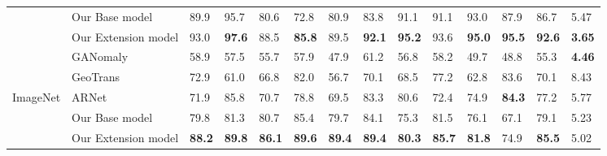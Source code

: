 \documentclass[journal]{IEEEtran}
\theoremstyle{remark}
\begin{document}
\begin{table*}[!htb]
\begin{minipage}[t]{0.95\textwidth}
\begin{tabular}{cx{3.0cm}x{0.6cm}x{0.6cm}x{0.6cm}x{0.6cm}x{0.6cm}x{0.6cm}x{0.6cm}x{0.6cm}x{0.6cm}x{0.6cm}x{0.6cm}x{0.8cm}}
    & Our Base model & 89.9 & 95.7 & 80.6 & 72.8 & 80.9 & 83.8 & 91.1 & 91.1 & 93.0 & 87.9 & 86.7 & 5.47\\
	& Our Extension model & 93.0 & \textbf{97.6} & 88.5 & \textbf{85.8} & 89.5 & \textbf{92.1} & \textbf{95.2} & 93.6 & \textbf{95.0} & \textbf{95.5} & \textbf{92.6} & \textbf{3.65}\\
	\cmidrule(lr){1-14}
	    & GANomaly~\cite{Akcay2018} 
		& 58.9 & 57.5 & 55.7 & 57.9 & 47.9 & 61.2 & 56.8 & 58.2 & 49.7 & 48.8 & 55.3 & \textbf{4.46}\\
		& GeoTrans~\cite{golan2018deep} 
		& 72.9 & 61.0 & 66.8 & 82.0 & 56.7 & 70.1 & 68.5 & 77.2 & 62.8 & 83.6 & 70.1 & 8.43\\
		ImageNet & ARNet~\cite{fye2020ARNet} & 71.9 & 85.8 & 70.7 & 78.8 & 69.5 & 83.3 & 80.6 & 72.4 & 74.9 & \textbf{84.3} & 77.2 & 5.77\\
		\cmidrule(lr){2-2} \cmidrule(lr){3-3} \cmidrule(lr){4-4} \cmidrule(lr){5-5} \cmidrule(lr){6-6} \cmidrule(lr){7-7} \cmidrule(lr){8-8} \cmidrule(lr){9-9} \cmidrule(lr){10-10} \cmidrule(lr){11-11} \cmidrule(lr){12-12} \cmidrule(lr){13-13} \cmidrule(lr){14-14}
        
        & Our Base model & 79.8 & 81.3 & 80.7 & 85.4 & 79.7 & 84.1 & 75.3 & 81.5 & 76.1 & 67.1 & 79.1 & 5.23\\
        
		& Our Extension model & \textbf{88.2} & \textbf{89.8} & \textbf{86.1} & \textbf{89.6} & \textbf{89.4} & \textbf{89.4} & \textbf{80.3} & \textbf{85.7} & \textbf{81.8} & 74.9 & \textbf{85.5} & 5.02\\
		\cmidrule(lr){1-14}
	\end{tabular}
	\end{minipage}
	

\end{table*}
\end{document}
